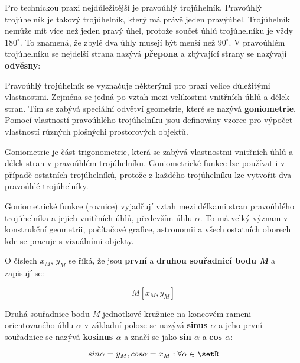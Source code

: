 \vskip 4mm
\centerline{}
\vskip 4mm


Pro technickou praxi nejdůležitější je pravoúhlý trojúhelník. Pravoúhlý trojúhelník je takový trojúhelník, který má právě jeden pravýúhel. Trojúhelník nemůže mít více než jeden pravý úhel, protože součet úhlů trojúhelníku je vždy $180^\circ$. To znamená, že zbylé dva úhly musejí být menší než $90^\circ$. V pravoúhlém trojúhelníku se nejdelší strana nazývá {\bf přepona} a zbývající strany se nazývají {\bf odvěsny}: 

\vskip 4mm
\centerline{}
\vskip 4mm

Pravoúhlý trojúhelník se vyznačuje některými pro praxi velice důležitými vlastnostmi. Zejména se jedná po vztah mezi velikostmi vnitřních úhlů a délek stran. Tím se zabývá speciální odvětví geometrie, které se nazývá {\bf goniometrie}. Pomocí vlastností pravoúhlého trojúhelníku jsou definovány vzorce pro výpočet vlastností různých plošnýchi prostorových objektů.


Goniometrie je část trigonometrie, která se zabývá vlastnostmi vnitřních úhlů a délek stran v pravoúhlém trojúhelníku. Goniometrické funkce lze používat i v případě ostatních trojúhelníků, protože z každého trojúhelníku lze vytvořit dva pravoúhlé trojúhelníky. 

Goniometrické funkce (rovnice) vyjadřují vztah mezi délkami stran pravoúhlého trojúhelníka a jejich vnitřních úhlů, především úhlu $\alpha$. To má velký význam v konstrukční geometrii, počítačové grafice, astronomii a všech ostatních oborech kde se pracuje s vizuálními objekty.




\vskip 4mm
\centerline{}
\vskip 4mm

O číslech $x_M$, $y_M$ se říká, že jsou {\bf první} a {\bf druhou souřadnicí bodu {\it M}} a zapisují se:

$$ M[x_M, y_M] $$

Druhá souřadnice bodu {\it M} jednotkové kružnice na koncovém rameni orientovaného  úhlu $\alpha$ v základní poloze se nazývá {\bf sinus $\alpha$} a jeho první souřadnice se nazývá {\bf kosinus $\alpha$} a značí se jako {\bf sin $\alpha$} a {\bf cos $\alpha$}:

$$ sin \alpha = y_M , cos \alpha = x_M : \forall \alpha \in \setR $$

